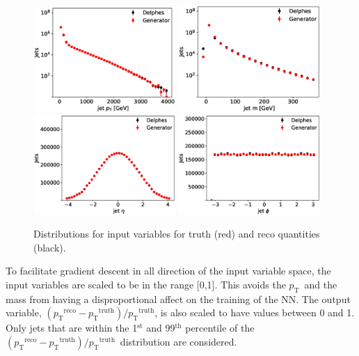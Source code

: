 \documentclass[showpacs,showkeys,preprint,prd,nofootinbib,linenumbers,12pt,superscriptaddress]{revtex4-1}
\def\pt{\ensuremath{p_{\mathrm{T}}}}
\def\ptRes{\ensuremath{(\pt^{\mathrm{reco}}-\pt^{\mathrm{truth}})/\pt^{\mathrm{truth}}}}
\begin{document}
\begin{figure}[h]
  \includegraphics[width=0.48\textwidth]{figures/nn/jet_pT_prescaling_log.eps}
  \includegraphics[width=0.48\textwidth]{figures/nn/jet_m_prescaling_log.eps}\\
  \includegraphics[width=0.48\textwidth]{figures/nn/jet_eta_prescaling.eps}
  \includegraphics[width=0.48\textwidth]{figures/nn/jet_phi_prescaling.eps}
  \caption{Distributions for input variables for truth (red) and reco quantities (black).}
  \label{fig:nnInputsPrescaling}
\end{figure}

To facilitate gradient descent in all direction of the input variable space, the input variables are scaled to be in the range [0,1]. This avoids the \pt\ and the mass from having a disproportional affect on the training of the NN. The output variable, \ptRes, is also scaled to have values between 0 and 1. Only jets that 
are within the 1$^{\mathrm{st}}$ and 99$^{\mathrm{th}}$ percentile of the \ptRes\ distribution are considered.
\end{document}
